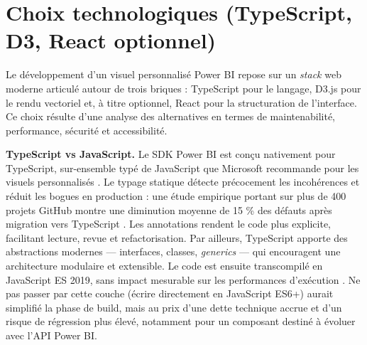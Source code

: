 \section{Choix technologiques (TypeScript, D3, React optionnel)}
\label{sec:techno}

Le développement d’un visuel personnalisé Power BI repose sur un \emph{stack}
web moderne articulé autour de trois briques : TypeScript pour le langage,
D3.js pour le rendu vectoriel et, à titre optionnel, React pour la
structuration de l’interface. Ce choix résulte d’une analyse des
alternatives en termes de maintenabilité, performance, sécurité et
accessibilité.

\textbf{TypeScript vs JavaScript.}
Le SDK Power BI est conçu nativement pour TypeScript, sur-ensemble typé de
JavaScript que Microsoft recommande pour les visuels personnalisés
\parencite{MicrosoftPBISDKTS2025}. Le typage statique détecte précocement
les incohérences et réduit les bogues en production : une étude
empirique portant sur plus de 400 projets GitHub montre une diminution
moyenne de 15 \% des défauts après migration vers TypeScript
\parencite{BeyerEtAl2023}. Les annotations rendent le code plus explicite,
facilitant lecture, revue et refactorisation. Par ailleurs, TypeScript
apporte des abstractions modernes — interfaces, classes, \emph{generics} —
qui encouragent une architecture modulaire et extensible. Le code est
ensuite transcompilé en JavaScript ES 2019, sans impact mesurable sur les
performances d’exécution \parencite{EcmaBenchmark2024}. Ne pas passer par
cette couche (écrire directement en JavaScript ES6+) aurait simplifié la
phase de build, mais au prix d’une dette technique accrue et d’un risque de
régression plus élevé, notamment pour un composant destiné à évoluer avec
l’API Power BI.

